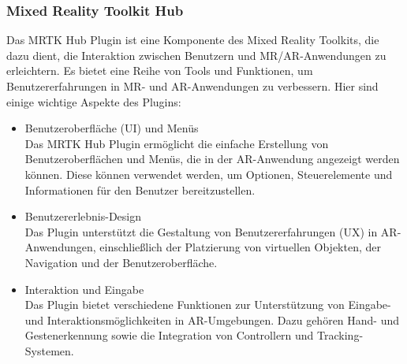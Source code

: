 \subsubsection{Mixed Reality Toolkit Hub}
Das MRTK Hub Plugin ist eine Komponente des Mixed Reality Toolkits, die dazu dient, die
Interaktion zwischen Benutzern und MR/AR-Anwendungen zu erleichtern. Es bietet eine Reihe von
Tools und Funktionen, um Benutzererfahrungen in MR- und AR-Anwendungen zu verbessern. Hier
sind einige wichtige Aspekte des Plugins:
\begin{itemize}
    \item Benutzeroberfläche (UI) und Menüs\\
    Das MRTK Hub Plugin ermöglicht die einfache Erstellung von Benutzeroberflächen und Menüs,
    die in der AR-Anwendung angezeigt werden können. Diese können verwendet werden, um Optionen,
    Steuerelemente und Informationen für den Benutzer bereitzustellen.
    \item Benutzererlebnis-Design\\
    Das Plugin unterstützt die Gestaltung von Benutzererfahrungen (UX) in AR-Anwendungen,
    einschließlich der Platzierung von virtuellen Objekten, der Navigation und der
    Benutzeroberfläche.
    \item Interaktion und Eingabe\\
    Das Plugin bietet verschiedene Funktionen zur Unterstützung von Eingabe- und
    Interaktionsmöglichkeiten in AR-Umgebungen. Dazu gehören Hand- und Gestenerkennung sowie
    die Integration von Controllern und Tracking-Systemen.
\end{itemize}


